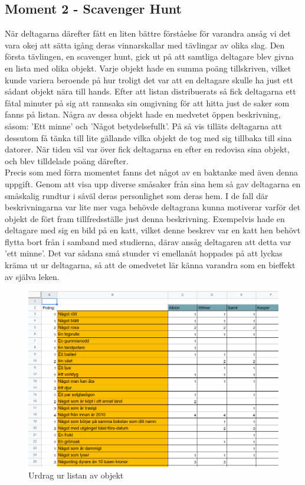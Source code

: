 \documentclass[a4paper, titlepage,12pt]{article}
\begin{document}
		\subsection{Moment 2 - Scavenger Hunt}

			När deltagarna därefter fått en liten bättre förståelse för varandra ansåg vi det vara okej att sätta igång deras vinnarskallar med tävlingar av olika slag. Den första tävlingen, en scavenger hunt, gick ut på att samtliga deltagare blev givna en lista med olika objekt. Varje objekt hade en summa poäng tillskriven, vilket kunde variera beroende på hur troligt det var att en deltagare skulle ha just ett sådant objekt nära till hands. Efter att listan distribuerats så fick deltagarna ett fåtal minuter på sig att rannsaka sin omgivning för att hitta just de saker som fanns på listan. Några av dessa objekt hade en medvetet öppen beskrivning, såsom: 'Ett minne' och 'Något betydelsefullt'. På så vis tilläts deltagarna att dessutom få tänka till lite gällande vilka objekt de tog med sig tillbaka till sina datorer. När tiden väl var över fick deltagarna en efter en redovisa sina objekt, och blev tilldelade poäng därefter.\\

			Precis som med förra momentet fanns det något av en baktanke med även denna uppgift. Genom att visa upp diverse småsaker från sina hem så gav deltagarna en småskalig rundtur i såväl deras personlighet som deras hem. I de fall där beskrivningarna var lite mer vaga behövde deltagrana kunna motiverar varför det objekt de fört fram tillfredsställe just denna beskrivning. Exempelvis hade en deltagare med sig en bild på en katt, vilket denne beskrev var en katt hen behövt flytta bort från i samband med studierna, därav ansåg deltagaren att detta var 'ett minne'. Det var sådana små stunder vi emellanåt hoppades på att lyckas kräma ut ur deltagarna, så att de omedvetet lär känna varandra som en bieffekt av själva leken.

			\begin{figure}
				\includegraphics[scale=0.6]{./scav_list.png}
				\caption{Urdrag ur listan av objekt}
			\end{figure}
\end{document}
